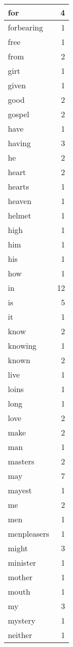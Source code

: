 \begin{center}
\begin{longtable}{l|r}
for & 4\\ \hline 
forbearing & 1\\ \hline 
free & 1\\ \hline 
from & 2\\ \hline 
girt & 1\\ \hline 
given & 1\\ \hline 
good & 2\\ \hline 
gospel & 2\\ \hline 
have & 1\\ \hline 
having & 3\\ \hline 
he & 2\\ \hline 
heart & 2\\ \hline 
hearts & 1\\ \hline 
heaven & 1\\ \hline 
helmet & 1\\ \hline 
high & 1\\ \hline 
him & 1\\ \hline 
his & 1\\ \hline 
how & 1\\ \hline 
in & 12\\ \hline 
is & 5\\ \hline 
it & 1\\ \hline 
know & 2\\ \hline 
knowing & 1\\ \hline 
known & 2\\ \hline 
live & 1\\ \hline 
loins & 1\\ \hline 
long & 1\\ \hline 
love & 2\\ \hline 
make & 2\\ \hline 
man & 1\\ \hline 
masters & 2\\ \hline 
may & 7\\ \hline 
mayest & 1\\ \hline 
me & 2\\ \hline 
men & 1\\ \hline 
menpleasers & 1\\ \hline 
might & 3\\ \hline 
minister & 1\\ \hline 
mother & 1\\ \hline 
mouth & 1\\ \hline 
my & 3\\ \hline 
mystery & 1\\ \hline 
neither & 1\\ \hline 

\end{longtable}
\end{center}
